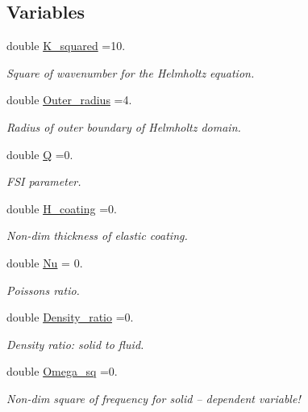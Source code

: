 \subsection*{Variables}
\begin{DoxyCompactItemize}
\item 
double \hyperlink{namespaceGlobal__Parameters_a91a3fa265abaf9e724c668ee800ffb29}{K\+\_\+squared} =10.
\begin{DoxyCompactList}\small\item\em Square of wavenumber for the Helmholtz equation. \end{DoxyCompactList}\item 
double \hyperlink{namespaceGlobal__Parameters_a88ded445ecd7bd89701409e68fd0b900}{Outer\+\_\+radius} =4.
\begin{DoxyCompactList}\small\item\em Radius of outer boundary of Helmholtz domain. \end{DoxyCompactList}\item 
double \hyperlink{namespaceGlobal__Parameters_a7814fddf663e56168174a42d2cd6b4c1}{Q} =0.
\begin{DoxyCompactList}\small\item\em F\+SI parameter. \end{DoxyCompactList}\item 
double \hyperlink{namespaceGlobal__Parameters_ae3cf8878ede839bffda01f79bbe3e819}{H\+\_\+coating} =0.
\begin{DoxyCompactList}\small\item\em Non-\/dim thickness of elastic coating. \end{DoxyCompactList}\item 
double \hyperlink{namespaceGlobal__Parameters_a20fccdcfa2c15ad8b951b9ada3bb1661}{Nu} = 0.
\begin{DoxyCompactList}\small\item\em Poisson\textquotesingle{}s ratio. \end{DoxyCompactList}\item 
double \hyperlink{namespaceGlobal__Parameters_a517d4c31b8bce6563c2f605266dd9679}{Density\+\_\+ratio} =0.
\begin{DoxyCompactList}\small\item\em Density ratio\+: solid to fluid. \end{DoxyCompactList}\item 
double \hyperlink{namespaceGlobal__Parameters_af9e1e178dfb7f5e35b452599bd4c4324}{Omega\+\_\+sq} =0.
\begin{DoxyCompactList}\small\item\em Non-\/dim square of frequency for solid -- dependent variable! \end{DoxyCompactList}\item 

\end{DoxyCompactItemize}
